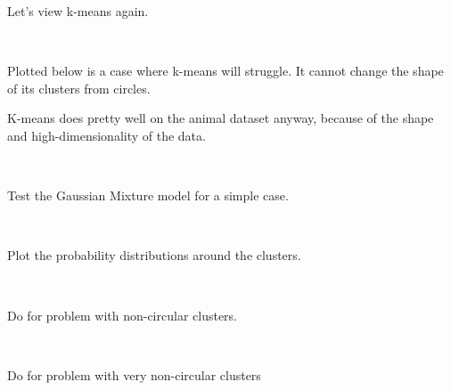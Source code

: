 \documentclass{article} %
\begin{document}
Let's view k-means again.

    \begin{center}
    \end{center}
    { \hspace*{\fill} \\}

Plotted below is a case where k-means will struggle.
 It cannot change the shape of its clusters from circles.

K-means does pretty well on the animal dataset anyway, because of the shape and high-dimensionality of the data.

    \begin{center}
    \end{center}
    { \hspace*{\fill} \\}

Test the Gaussian Mixture model for a simple case.

    \begin{center}
    \end{center}
    { \hspace*{\fill} \\}

Plot the probability distributions around the clusters.

   \begin{center}
    \end{center}
    { \hspace*{\fill} \\}

Do for problem with non-circular clusters.

    \begin{center}
    \end{center}
    { \hspace*{\fill} \\}

Do for problem with very non-circular clusters

    \begin{center}
    \end{center}
    { \hspace*{\fill} \\}
\end{document}
